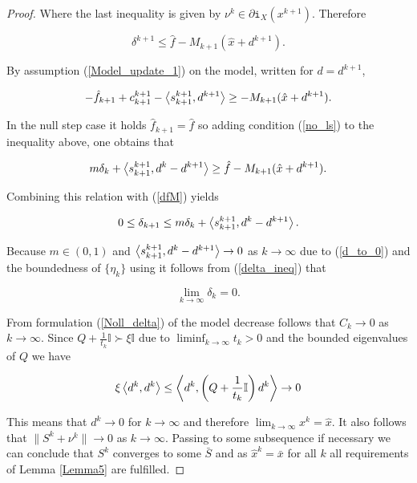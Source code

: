 \begin{proof}
Where the last inequality is given by \(\nu^k \in \partial\mathtt{i}_{X}(x^{k+1})\). Therefore 

\begin{equation}
	\delta^{k+1} \leq \hat{f}-M_{k+1}(\hat{x}+d^{k+1}).
	\label{dfM}
\end{equation}

By assumption (\ref{Model_update_1}) on the model, written for \(d=d^{k+1}\),

\begin{equation*}
	-\hat{f}_{k+1}+c^{k+1}_{k+1}-\left\langle s^{k+1}_{k+1},d^{k+1}\right\rangle \geq -M_{k+1}(\hat{x}+d^{k+1}).
\end{equation*}

In the null step case it holds \(\hat{f}_{k+1}=\hat{f}\) so adding condition (\ref{no_ls}) to the inequality above, one obtains that

\begin{equation*}
	m\delta_k+\left\langle s^{k+1}_{k+1},d^k-d^{k+1}\right\rangle \geq \hat{f}-M_{k+1}(\hat{x}+d^{k+1}).
\end{equation*}

Combining this relation with (\ref{dfM}) yields

\begin{equation*}
	0 \leq \delta_{k+1} \leq m\delta_k + \left\langle s^{k+1}_{k+1},d^k-d^{k+1}\right\rangle.
	\label{delta_ineq}
\end{equation*}

Because \(m \in (0,1)\) and \(\left\langle s^{k+1}_{k+1},d^k-d^{k+1}\right\rangle \to 0\) as \(k \to \infty\) due to (\ref{d_to_0}) and the boundedness of \(\{\eta_k\}\) using \cite[Lemma 3, p.45]{Polyak1987} it follows from  (\ref{delta_ineq}) that 

\begin{equation*}
	\lim_{k \to \infty} \delta_k = 0.
\end{equation*}

From  formulation (\ref{Noll_delta}) of the model decrease follows that \(C_k \to 0\) as \(k \to \infty\). Since {\(Q+\frac{1}{t_k}\mathbb{I} \succ \xi\mathbb{I}\)} due to \(\liminf_{k \to \infty} t_k > 0\) and the bounded eigenvalues of \(Q\) we have 

\begin{equation*}
	\xi \left\langle d^k,d^k\right\rangle \leq \left\langle d^k,\left(Q+\frac{1}{t_k}\mathbb{I}\right)d^k\right\rangle \to 0
\end{equation*}

This means that \(d^k \to 0\) for \(k \to \infty\) and therefore \(\lim_{k \to \infty}x^k = \hat{x}\). It also follows that \(\|S^k+\nu^k\| \to 0\) as \(k \to \infty\). Passing to some subsequence if necessary we can conclude that \(S^k\) converges to some \(\bar{S}\) and as \(\hat{x}^k = \bar{x}\) for all \(k\) all requirements of Lemma \ref{Lemma5} are fulfilled.

\end{proof}

